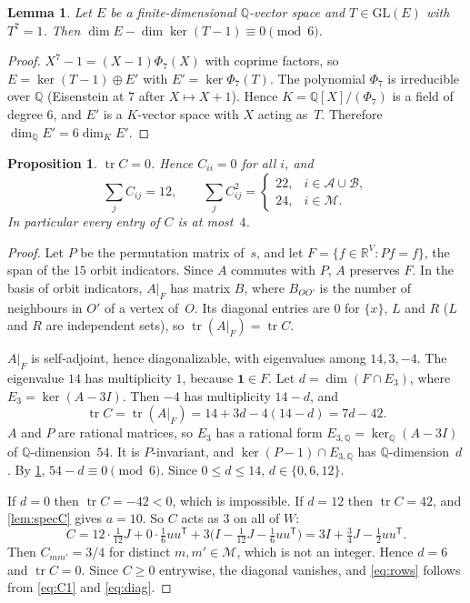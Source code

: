 \documentclass[11pt,a4paper]{amsart}
\newtheorem{proposition}[theorem]{Proposition}
\newtheorem{lemma}[theorem]{Lemma}
\theoremstyle{definition}
\theoremstyle{remark}
\newcommand{\Q}{\mathbb{Q}}
\newcommand{\R}{\mathbb{R}}
\newcommand{\one}{\mathbf{1}}
\newcommand{\cA}{\mathcal{A}}
\newcommand{\cB}{\mathcal{B}}
\newcommand{\cM}{\mathcal{M}}
\newcommand{\tr}{\operatorname{tr}}
\begin{document}
\begin{lemma}\label{lem:rational}
Let $E$ be a finite-dimensional $\Q$-vector space and $T\in\mathrm{GL}(E)$ with $T^7=1$. Then
$\dim E-\dim\ker(T-1)\equiv0\pmod6$.
\end{lemma}

\begin{proof}
$X^7-1=(X-1)\Phi_7(X)$ with coprime factors, so $E=\ker(T-1)\oplus E'$ with $E'=\ker\Phi_7(T)$. The
polynomial $\Phi_7$ is irreducible over $\Q$ (Eisenstein at $7$ after $X\mapsto X+1$). Hence
$K=\Q[X]/(\Phi_7)$ is a field of degree $6$, and $E'$ is a $K$-vector space with $X$ acting as~$T$.
Therefore $\dim_\Q E'=6\dim_K E'$.
\end{proof}

\begin{proposition}\label{prop:zerodiag}
$\tr C=0$. Hence $C_{ii}=0$ for all $i$, and
\begin{equation}\label{eq:rows}
\sum_j C_{ij}=12,\qquad \sum_j C_{ij}^2=\begin{cases}22,& i\in\cA\cup\cB,\\ 24,& i\in\cM.\end{cases}
\end{equation}
In particular every entry of $C$ is at most~$4$.
\end{proposition}

\begin{proof}
Let $P$ be the permutation matrix of~$s$, and let $F=\{f\in\R^V: Pf=f\}$, the span of the $15$ orbit
indicators. Since $A$ commutes with $P$, $A$ preserves $F$. In the basis of orbit indicators, $A|_F$ has
matrix $B$, where $B_{OO'}$ is the number of neighbours in $O'$ of a vertex of~$O$. Its diagonal
entries are $0$ for $\{x\}$, $L$ and $R$ ($L$ and $R$ are independent sets), so $\tr(A|_F)=\tr C$.

$A|_F$ is self-adjoint, hence diagonalizable, with eigenvalues among $14,3,-4$. The eigenvalue $14$ has
multiplicity $1$, because $\one\in F$. Let $d=\dim(F\cap E_3)$, where $E_3=\ker(A-3I)$. Then $-4$ has
multiplicity $14-d$, and
\[
\tr C=\tr(A|_F)=14+3d-4(14-d)=7d-42 .
\]
$A$ and $P$ are rational matrices, so $E_3$ has a rational form $E_{3,\Q}=\ker_{\Q}(A-3I)$ of
$\Q$-dimension~$54$. It is $P$-invariant, and $\ker(P-1)\cap E_{3,\Q}$ has $\Q$-dimension~$d$. By
\cref{lem:rational}, $54-d\equiv0\pmod 6$. Since $0\le d\le14$, $d\in\{0,6,12\}$.

If $d=0$ then $\tr C=-42<0$, which is impossible. If $d=12$ then $\tr C=42$, and \cref{lem:specC} gives
$a=10$. So $C$ acts as $3$ on all of $W$:
\[
C=12\cdot\tfrac{1}{12}J+0\cdot\tfrac16uu^{\mathsf T}+3\bigl(I-\tfrac1{12}J-\tfrac16uu^{\mathsf T}\bigr)
=3I+\tfrac34J-\tfrac12uu^{\mathsf T}.
\]
Then $C_{mm'}=3/4$ for distinct $m,m'\in\cM$, which is not an integer. Hence $d=6$ and $\tr C=0$.
Since $C\ge0$ entrywise, the diagonal vanishes, and \eqref{eq:rows} follows from \eqref{eq:C1} and
\eqref{eq:diag}.
\end{proof}
\end{document}
